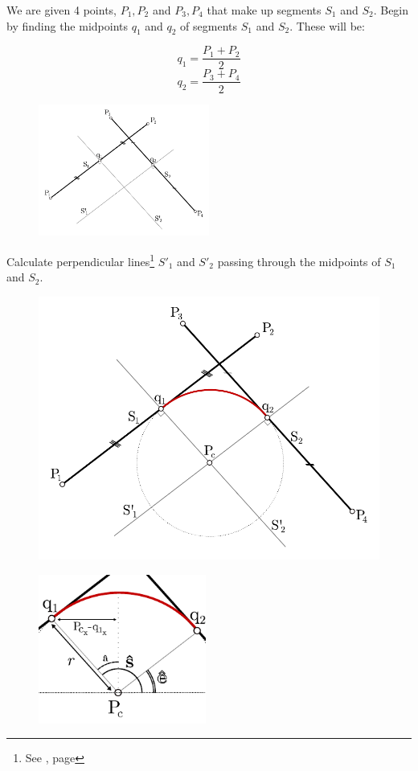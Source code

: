 \documentclass[12pt,openany,a4,usenames,dvipsnames]{book}
\begin{document}
\noindent{}We are given 4 points, $P_{1}, P_{2}$ and $P_{3}, P_{4}$ that make up segments $S_1$ and $S_2$.
Begin by finding the midpoints $q_1$ and $q_2$ of segments $S_1$ and $S_2$. These will be:

$$q_1 = \frac{P_1 + P_2}{2}$$
$$q_2 = \frac{P_3 + P_4}{2}$$

\begin{figure}[H]
  \centering{}
\includegraphics[width=0.5\textwidth,keepaspectratio]{figures/fillet_2.pdf}
\end{figure}

\noindent{}Calculate perpendicular lines\footnote{See \emph{}, page \pageref{sec:perpendicular}} $S'_1$ and $S'_2$ passing through the midpoints of $S_1$ and $S_2$.

\begin{figure}[H]
  \centering{}
  \includegraphics[width=\textwidth,keepaspectratio]{figures/fillet.pdf}
\end{figure}

\begin{figure}
  \centering{}
  \includegraphics[width=0.49\textwidth,keepaspectratio]{figures/fillet_3.pdf}
\end{figure}
\end{document}
